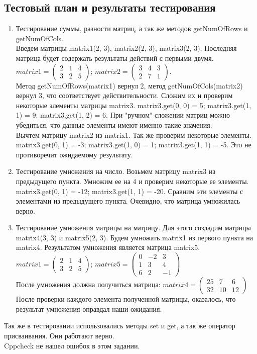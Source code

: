\documentclass[12pt,a4paper]{report}
\begin{document}
\subsection{Тестовый план и результаты тестирования}
\begin{enumerate}
\item
Тестирование суммы, разности матриц, а так же методов getNumOfRows и getNumOfCols. \\
Введем матрицы matrix1(2, 3), matrix2(2, 3), matrix3(2, 3). Последняя матрица будет содержать результаты действий с первыми двумя. \\
$matrix1 = \begin{pmatrix} 2 & 1 & 4 \\ 3 & 2 & 5 \end{pmatrix}$; 	$matrix2 = \begin{pmatrix} 3 & 4 & 3 \\ 2 & 7 & 1 \end{pmatrix}$.\\
Метод getNumOfRows(matrix1) вернул 2, метод getNumOfCols(matrix2) вернул 3, что соответствует действительности. 
Сложим их и проверим некоторые элементы матрицы matrix3. matrix3.get(0, 0) = 5; matrix3.get(1, 1) = 9; matrix3.get(1, 2) = 6. При "ручном" сложении матриц можно убедиться, что данные элементы имеют именно такие значения. \\
Вычтем матрицу matrix2 из matrix1. Так же проверим некоторые элементы. matrix3.get(0, 1) = -3; matrix3.get(1, 0) = 1; matrix3.get(1, 1) = -5. Это не противоречит ожидаемому результату. \\
\item 
Тестирование умножения на число. Возьмем матрицу matrix3 из предыдущего пункта. Умножим ее на 4 и проверим некоторые ее элементы. matrix3.get(0, 1) = -12; matrix3.get(1, 1) = -20. Сравним эти элементы с элементами из предыдущего пункта. Очевидно, что матрица умножилась верно. 
\item 
Тестирование умножения матрицы на матрицу. Для этого создадим матрицы matrix4(3, 3) и matrix5(2, 3). Будем умножать matrix1 из первого пункта на matrix4. Результатом умножения является матрица matrix5. \\
$matrix1 = \begin{pmatrix} 2 & 1 & 4 \\ 3 & 2 & 5 \end{pmatrix}$; $matrix5 = \begin{pmatrix}
0 & -2 & 3 \\ 1 & 3 & 4 \\ 6 & 2 & -1 \end{pmatrix} $ \\
После умножения должна получиться матрица: $matrix4 = \begin{pmatrix} 25 & 7 & 6 \\ 32 & 10 & 12 \end{pmatrix}$ \\
После проверки каждого элемента полученной матрицы, оказалось, что результат умножения оправдал наши ожидания.
\end{enumerate}
Так же в тестировании использовались методы set и get, а так же оператор присваивания. Они работают верно.\\
Cppcheck не нашел ошибок в этом задании. 
\end{document}
